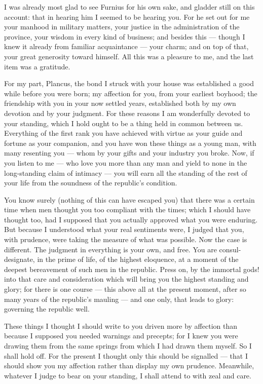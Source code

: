 

 I was already most glad to see Furnius for his own sake, and gladder still on this account: that in hearing him I seemed to be hearing you. For he set out for me your manhood in military matters, your justice in the administration of the province, your wisdom in every kind of business; and besides this --- though I knew it already from familiar acquaintance --- your charm; and on top of that, your great generosity toward himself. All this was a pleasure to me, and the last item was a gratitude.

 For my part, Plancus, the bond I struck with your house was established a good while before you were born; my affection for you, from your earliest boyhood; the friendship with you in your now settled years, established both by my own devotion and by your judgment. For these reasons I am wonderfully devoted to your standing, which I hold ought to be a thing held in common between us. Everything of the first rank you have achieved with virtue as your guide and fortune as your companion, and you have won these things as a young man, with many resenting you --- whom by your gifts and your industry you broke. Now, if you listen to me --- who love you more than any man and yield to none in the long-standing claim of intimacy --- you will earn all the standing of the rest of your life from the soundness of the republic's condition.

 You know surely (nothing of this can have escaped you) that there was a certain time when men thought you too compliant with the times; which I should have thought too, had I supposed that you actually approved what you were enduring. But because I understood what your real sentiments were, I judged that you, with prudence, were taking the measure of what was possible. Now the case is different. The judgment in everything is your own, and free. You are consul-designate, in the prime of life, of the highest eloquence, at a moment of the deepest bereavement of such men in the republic. Press on, by the immortal gods! into that care and consideration which will bring you the highest standing and glory; for there is one course --- this above all at the present moment, after so many years of the republic's mauling --- and one only, that leads to glory: governing the republic well.

 These things I thought I should write to you driven more by affection than because I supposed you needed warnings and precepts; for I knew you were drawing them from the same springs from which I had drawn them myself. So I shall hold off. For the present I thought only this should be signalled --- that I should show you my affection rather than display my own prudence. Meanwhile, whatever I judge to bear on your standing, I shall attend to with zeal and care.
